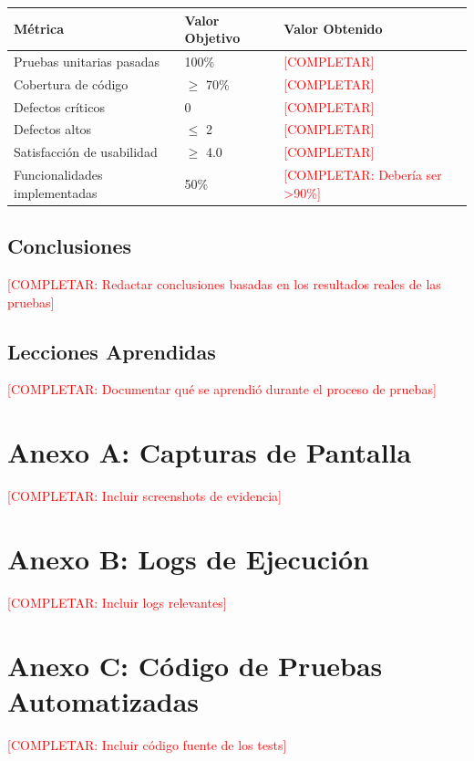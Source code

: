 \documentclass[12pt,a4paper]{article}
\begin{document}
\begin{longtable}{|p{6cm}|p{4cm}|p{4cm}|}
\hline
\textbf{Métrica} & \textbf{Valor Objetivo} & \textbf{Valor Obtenido} \\
\hline
\endfirsthead
Pruebas unitarias pasadas & 100\% & \textcolor{red}{[COMPLETAR]} \\
\hline
Cobertura de código & $\geq$ 70\% & \textcolor{red}{[COMPLETAR]} \\
\hline
Defectos críticos & 0 & \textcolor{red}{[COMPLETAR]} \\
\hline
Defectos altos & $\leq$ 2 & \textcolor{red}{[COMPLETAR]} \\
\hline
Satisfacción de usabilidad & $\geq$ 4.0 & \textcolor{red}{[COMPLETAR]} \\
\hline
Funcionalidades implementadas & 50\% & \textcolor{red}{[COMPLETAR: Debería ser >90\%]} \\
\hline
\end{longtable}

\subsection{Conclusiones}

\textcolor{red}{[COMPLETAR: Redactar conclusiones basadas en los resultados reales de las pruebas]}

\subsection{Lecciones Aprendidas}

\textcolor{red}{[COMPLETAR: Documentar qué se aprendió durante el proceso de pruebas]}

\appendix
\section{Anexo A: Capturas de Pantalla}
\textcolor{red}{[COMPLETAR: Incluir screenshots de evidencia]}

\section{Anexo B: Logs de Ejecución}
\textcolor{red}{[COMPLETAR: Incluir logs relevantes]}

\section{Anexo C: Código de Pruebas Automatizadas}
\textcolor{red}{[COMPLETAR: Incluir código fuente de los tests]}

\end{document}
